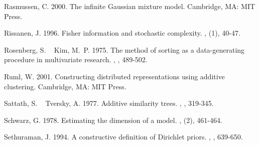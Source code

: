 \documentclass[11pt]{article}
\begin{document}
\begin{thebibliography}{}
%
%
Rasmussen, C.%
%
\newblock{}\BBOP{}2000\BBCP{}.
\newblock{}\BBOQ{}The infinite {G}aussian mixture model.\BBCQ{}
\newblock{}\BIn{} 
\newblock{}Cambridge, MA: MIT Press.

%
%
Rissanen, J.%
%
\newblock{}\BBOP{}1996\BBCP{}.
\newblock{}\BBOQ{}Fisher information and stochastic complexity.\BBCQ{}
\newblock{}, (1), 40-47.

%
%
Rosenberg, S.%
\BCBT{}\ \BBA{} Kim, M.~P.%
%
\newblock{}\BBOP{}1975\BBCP{}.
\newblock{}\BBOQ{}The method of sorting as a data-generating procedure in
  multivariate research.\BBCQ{}
\newblock{}, , 489-502.

%
%
Ruml, W.%
%
\newblock{}\BBOP{}2001\BBCP{}.
\newblock{}\BBOQ{}Constructing distributed representations using additive
  clustering.\BBCQ{}
\newblock{}\BIn{} 
\newblock{}Cambridge, MA: MIT Press.

%
%
Sattath, S.%
\BCBT{}\ \BBA{} Tversky, A.%
%
\newblock{}\BBOP{}1977\BBCP{}.
\newblock{}\BBOQ{}Additive similarity trees.\BBCQ{}
\newblock{}, , 319-345.

%
%
Schwarz, G.%
%
\newblock{}\BBOP{}1978\BBCP{}.
\newblock{}\BBOQ{}Estimating the dimension of a model.\BBCQ{}
\newblock{}, (2), 461-464.

%
%
Sethuraman, J.%
%
\newblock{}\BBOP{}1994\BBCP{}.
\newblock{}\BBOQ{}A constructive definition of {D}irichlet priors.\BBCQ{}
\newblock{}, , 639-650.


\end{thebibliography}
\end{document}
